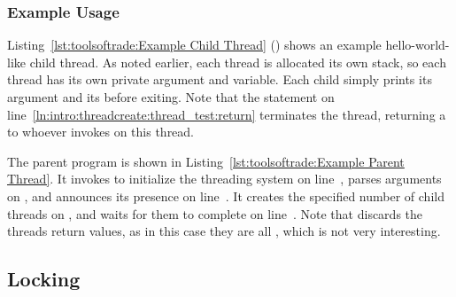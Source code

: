 \subsubsection{Example Usage}

Listing~\ref{lst:toolsoftrade:Example Child Thread} ()
shows an example hello-world-like child thread.
As noted earlier, each thread is allocated its own stack, so
each thread has its own private  argument and  variable.
Each child simply prints its argument and its 
before exiting.
Note that the  statement on
line~\ref{ln:intro:threadcreate:thread_test:return} terminates the thread,
returning a  to whoever invokes  on this
thread.

\begin{listing}[tbp]

\caption{Example Child Thread}
\label{lst:toolsoftrade:Example Child Thread}
\end{listing}

\begin{fcvref}
The parent program is shown in
Listing~\ref{lst:toolsoftrade:Example Parent Thread}.
It invokes  to initialize the threading system on
line~,
parses arguments on ,
and announces its presence on line~.
It creates the specified number of child threads on
,
and waits for them to complete on line~.
Note that  discards the threads return values,
as in this case they are all , which is not very interesting.
\end{fcvref}

\begin{listing}[tbp]

\caption{Example Parent Thread}
\label{lst:toolsoftrade:Example Parent Thread}
\end{listing}

\QuickQuizEnd

\subsection{Locking}
\label{sec:toolsoftrade:Locking}

